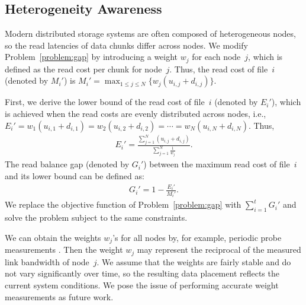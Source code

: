 \subsection{Heterogeneity Awareness}
\label{subsec:heterogeneity}

Modern distributed storage systems are often composed of heterogeneous nodes,
so the read latencies of data chunks differ across nodes. We modify 
Problem~\ref{problem:gap} by introducing a weight $w_j$ for each node~$j$,
which is defined as the read cost per chunk for node~$j$.  Thus, the read cost
of file~$i$ (denoted by $M_i'$) is 
$M_i' = \max_{1\le j\le N} \{w_j (u_{i,j}+d_{i,j})\}$. 

First, we derive the lower bound of the read cost of file~$i$ (denoted by
$E_i'$), which is achieved when the read costs are evenly distributed across
nodes, i.e., $E_i' = w_1(u_{i,1} + d_{i,1}) = w_2(u_{i,2} + d_{i,2}) = \cdots
= w_{N}(u_{i,N} + d_{i,N})$.  Thus, 
%
\begin{align}
E_i' = \frac{\sum_{j=1}^{N}(u_{i,j}+d_{i,j})}{\sum_{j=1}^{N}\frac{1}{w_j}}.
\end{align}
%
The read balance gap (denoted by $G_i'$) between the maximum read cost of
file~$i$ and its lower bound can be defined as:
\begin{align}
G_i' = 1 - \frac{E_i'}{M_i'}.
\label{eqn:hete_min_max}
\end{align}
We replace the objective function of Problem~\ref{problem:gap} with
$\sum_{i=1}^{t}G_i'$ and solve the problem subject to the same constraints. 

We can obtain the weights $w_j$'s for all nodes by, for example, periodic
probe measurements \cite{chowdhury13}.  Then the weight $w_j$ may represent
the reciprocal of the measured link bandwidth of node~$j$.  We assume that the
weights are fairly stable and do not vary significantly over time, so the
resulting data placement reflects the current system conditions.  We pose the
issue of performing accurate weight measurements as future work. 

